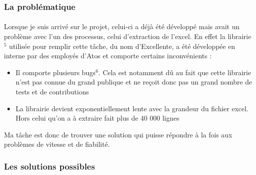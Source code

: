 \documentclass[12pt]{article}
\begin{document}
\begin {sloppypar}
\subsubsection{La problématique}
\paragraph {}
Lorsque je suis arrivé sur le projet, celui-ci a déjà été développé mais avait un 
problème avec l'un des processus, celui d'extraction de l'excel. En effet la librairie$^{5}$
utilisée pour remplir cette tâche, du nom d'Excellente, a été développée en interne par des 
employés d'Atos et comporte certains inconvénients : 
\begin{itemize}
  \item 
    Il comporte plusieurs bugs$^{6}$. Cela est notamment dû au fait que cette librairie 
    n'est pas connue du grand publique et ne reçoit donc pas un grand nombre de tests et 
    de contributions 
  \item 
    La librairie devient exponentiellement lente avec la grandeur du fichier excel. Hors
    celui qu'on a à extraire fait plus de 40 000 lignes
\end{itemize}
Ma tâche est donc de trouver une solution qui puisse répondre à la fois aux problèmes
de vitesse et de fiabilité.
\newpage
\subsubsection{Les solutions possibles}

\end{sloppypar}
\end{document}
